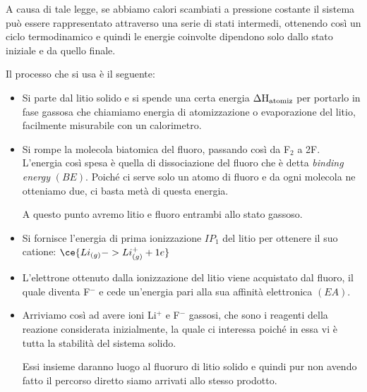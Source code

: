 \vspace{0.2cm}A causa di tale legge, se abbiamo calori scambiati a pressione costante il sistema può essere rappresentato attraverso una serie di stati intermedi, ottenendo così un ciclo termodinamico e quindi le energie coinvolte dipendono solo dallo stato iniziale e da quello finale.

\vspace{0.2cm}Il processo che si usa è il seguente:
\begin{itemize}
    \item Si parte dal litio solido e si spende una certa energia $\Delta\text{H}_{\rm atomiz}$ per portarlo in fase gassosa che chiamiamo energia di atomizzazione o evaporazione del litio, facilmente misurabile con un calorimetro.
    \item Si rompe la molecola biatomica del fluoro, passando così da F$_2$ a 2F. L'energia così spesa è quella di dissociazione del fluoro che è detta \textit{binding energy} $(BE)$. Poiché ci serve solo un atomo di fluoro e da ogni molecola ne otteniamo due, ci basta metà di questa energia.
    
    A questo punto avremo litio e fluoro entrambi allo stato gassoso.
    \item Si fornisce l'energia di prima ionizzazione $IP_1$ del litio per ottenere il suo catione: $\ce{Li_{(g)} -> Li^{+}_{(g)} + 1e}$
    \item L'elettrone ottenuto dalla ionizzazione del litio viene acquistato dal fluoro, il quale diventa F$^-$ e cede un'energia pari alla sua affinità elettronica $(EA)$.
    \item Arriviamo così ad avere ioni Li$^+$ e F$^-$ gassosi, che sono i reagenti della reazione considerata inizialmente, la quale ci interessa poiché in essa vi è tutta la stabilità del sistema solido.
    
    Essi insieme daranno luogo al fluoruro di litio solido e quindi pur non avendo fatto il percorso diretto siamo arrivati allo stesso prodotto.
\end{itemize}

